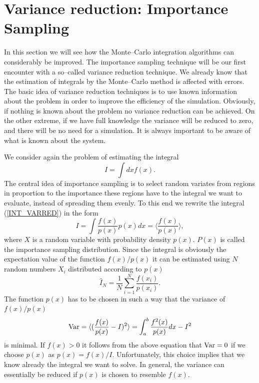 
\section{Variance reduction: Importance Sampling}
In this section we will see how the Monte--Carlo integration
algorithms can considerably be improved. The importance sampling 
technique will be our first encounter with a so--called variance 
reduction technique. We already know that the estimation of 
integrals by the Monte--Carlo method is affected with errors. The
basic idea of variance reduction techniques is to use known 
information about the problem in order to improve the efficiency 
of the simulation. Obviously, if nothing is known about the 
problem no variance reduction can be achieved. On the other 
extreme, if we have full knowledge the variance will be reduced to 
zero, and there will be no need for a simulation. It is always 
important to be aware of what is known about the system.

We consider again the problem of estimating the integral
\begin{equation}
\label{INT_VARRED}
I = \int dx f(x).
\end{equation}
The central idea of importance sampling is to select random 
variates from regions in proportion to the importance these 
regions have to the integral we want to evaluate, instead of 
spreading them evenly. To this end we rewrite the integral 
(\ref{INT_VARRED}) in the form
\begin{equation*}
I = \int \frac{f(x)}{p(x)} p(x) dx = \langle 
\frac{f(x)}{p(x)}\rangle,
\end{equation*}
where $X$ is a random variable with probability density $p(x)$.
$P(x)$ is called the importance sampling distribution.  Since the
integral is obviously the expectation value of the function $f(x)/p(x)$
it can be estimated using $N$ random numbers $X_i$ distributed 
according to $p(x)$
\begin{equation*}
\hat{I}_N = \frac{1}{N} \sum_{i=1}^N \frac{f(x_i)}{p(x_i)}.
\end{equation*}
The function $p(x)$ has to be chosen in such a way that the 
variance of $f(x)/p(x)$ 
\begin{equation*}
{\rm Var} = \langle (\frac{f(x)}{p(x)}-I)^2\rangle
   = \int_a^b \frac{f^2(x)}{p(x)}dx - I^2
\end{equation*}
is minimal. If $f(x)>0$ it follows from the above equation that
${\rm Var}=0$ if we choose $p(x)$ as $p(x) = f(x)/I$. 
Unfortunately, this choice implies that we know already 
the integral we want to solve. In general, the variance can 
essentially be reduced if $p(x)$ is chosen to resemble $f(x)$.


